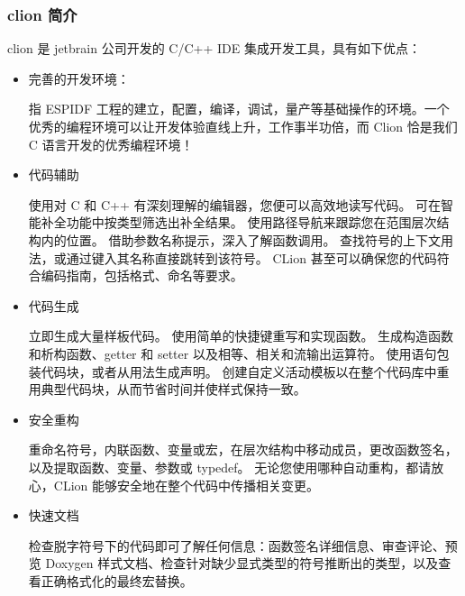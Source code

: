 \documentclass[a4paper,12pt,english]{sphinxmanual}
\begin{document}
\subsubsection{clion 简介}
\label{\detokenize{exp-esp32/ide/esp-idf-clion-dev:clion}}
\sphinxAtStartPar
clion 是 jetbrain 公司开发的 C/C++ IDE 集成开发工具，具有如下优点：
\begin{itemize}
\item {} 
\sphinxAtStartPar
完善的开发环境：

\sphinxAtStartPar
指 ESP\sphinxhyphen{}IDF 工程的建立，配置，编译，调试，量产等基础操作的环境。一个优秀的编程环境可以让开发体验直线上升，工作事半功倍，而 Clion 恰是我们 C 语言开发的优秀编程环境！

\item {} 
\sphinxAtStartPar
代码辅助

\sphinxAtStartPar
使用对 C 和 C++ 有深刻理解的编辑器，您便可以高效地读写代码。 可在智能补全功能中按类型筛选出补全结果。 使用路径导航来跟踪您在范围层次结构内的位置。 借助参数名称提示，深入了解函数调用。 查找符号的上下文用法，或通过键入其名称直接跳转到该符号。 CLion 甚至可以确保您的代码符合编码指南，包括格式、命名等要求。

\sphinxAtStartPar
{}

\item {} 
\sphinxAtStartPar
代码生成

\sphinxAtStartPar
立即生成大量样板代码。 使用简单的快捷键重写和实现函数。 生成构造函数和析构函数、getter 和 setter 以及相等、相关和流输出运算符。 使用语句包装代码块，或者从用法生成声明。 创建自定义活动模板以在整个代码库中重用典型代码块，从而节省时间并使样式保持一致。 

\item {} 
\sphinxAtStartPar
安全重构

\sphinxAtStartPar
重命名符号，内联函数、变量或宏，在层次结构中移动成员，更改函数签名，以及提取函数、变量、参数或 typedef。 无论您使用哪种自动重构，都请放心，CLion 能够安全地在整个代码中传播相关变更。

\sphinxAtStartPar
{}

\item {} 
\sphinxAtStartPar
快速文档

\sphinxAtStartPar
检查脱字符号下的代码即可了解任何信息：函数签名详细信息、审查评论、预览 Doxygen 样式文档、检查针对缺少显式类型的符号推断出的类型，以及查看正确格式化的最终宏替换。

\sphinxAtStartPar
{}

\end{itemize}
\end{document}
